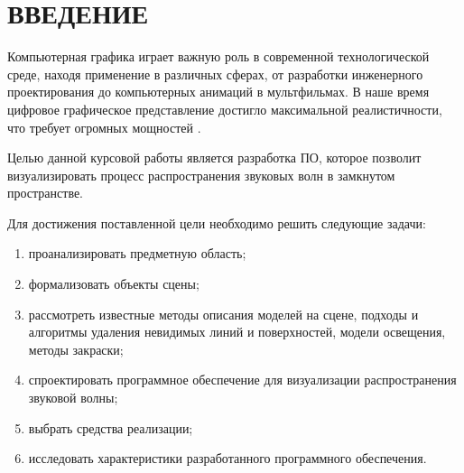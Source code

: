 \chapter*{ВВЕДЕНИЕ}

Компьютерная графика играет важную роль в современной технологической среде, находя применение в различных сферах, от разработки инженерного проектирования до компьютерных анимаций в мультфильмах.
В наше время цифровое графическое представление достигло максимальной реалистичности, что требует огромных мощностей \cite{usage}.

Целью данной курсовой работы является разработка ПО, которое позволит визуализировать процесс распространения звуковых волн в замкнутом пространстве.

Для достижения поставленной цели необходимо решить следующие задачи:
\begin{enumerate}
	\item проанализировать предметную область;
	\item формализовать объекты сцены;
	\item рассмотреть известные методы описания моделей на сцене, подходы и алгоритмы удаления невидимых линий и поверхностей, модели освещения, методы закраски;
	\item спроектировать программное обеспечение для визуализации распространения звуковой волны;
	\item выбрать средства реализации;
	\item исследовать характеристики разработанного программного обеспечения.
\end{enumerate}